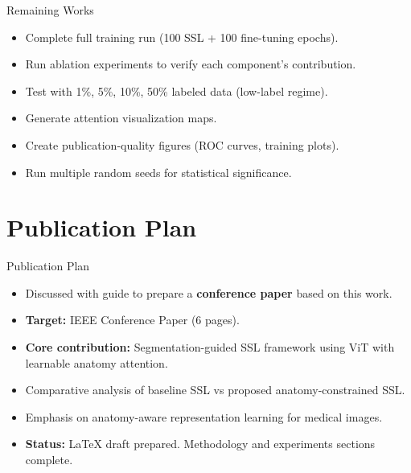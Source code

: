 \documentclass{beamer}
\begin{document}
\begin{frame}{Remaining Works}
\begin{itemize}
    \item Complete full training run (100 SSL + 100 fine-tuning epochs).
    \vspace{8pt}
    \item Run ablation experiments to verify each component's contribution.
    \vspace{8pt}
    \item Test with 1\%, 5\%, 10\%, 50\% labeled data (low-label regime).
    \vspace{8pt}
    \item Generate attention visualization maps.
    \vspace{8pt}
    \item Create publication-quality figures (ROC curves, training plots).
    \vspace{8pt}
    \item Run multiple random seeds for statistical significance.
\end{itemize}
\end{frame}


\section{Publication Plan}

\begin{frame}{Publication Plan}
\begin{itemize}
    \item Discussed with guide to prepare a \textbf{conference paper} based on this work.
    \vspace{6pt}
    \item \textbf{Target:} IEEE Conference Paper (6 pages).
    \vspace{6pt}
    \item \textbf{Core contribution:} Segmentation-guided SSL framework using ViT with learnable anatomy attention.
    \vspace{6pt}
    \item Comparative analysis of baseline SSL vs proposed anatomy-constrained SSL.
    \vspace{6pt}
    \item Emphasis on anatomy-aware representation learning for medical images.
    \vspace{6pt}
    \item \textbf{Status:} LaTeX draft prepared. Methodology and experiments sections complete.
\end{itemize}
\end{frame}
\end{document}
